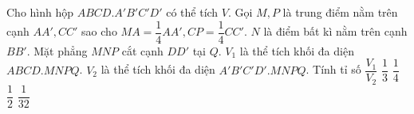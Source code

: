 \begin{vd}
	Cho hình hộp $ABCD.A'B'C'D'$ có thể tích $V$. Gọi $M,P$ là trung điểm nằm trên cạnh $AA',CC'$ sao cho $MA=\dfrac{1}{4}AA', CP=\dfrac{1}{4}CC'$. $N$ là điểm bất kì nằm trên cạnh $BB'$. Mặt phẳng $MNP$ cắt cạnh $DD'$ tại $Q$. $V_1$ là thể tích khối đa diện $ABCD.MNPQ$. $V_2$ là thể tích khối đa diện $A'B'C'D'.MNPQ$. Tính tỉ số $\dfrac{V_1}{V_2}$
	\choice
	{\True $\dfrac{1}{3}$}
	{$\dfrac{1}{4}$}
	{$\dfrac{1}{2}$}
	{$\dfrac{1}{32}$}
\end{vd}